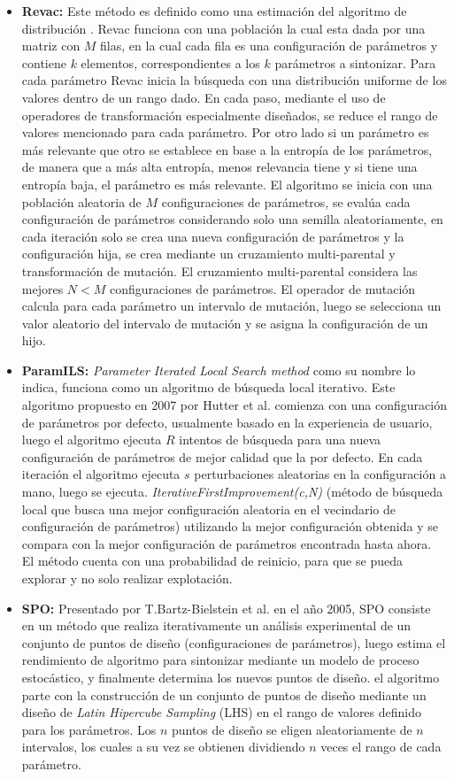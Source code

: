 \documentclass[letter, 10pt]{article}
\begin{document}
\begin{multicols}{2}
\begin{itemize}
    \item \textbf{Revac:} Este método es definido como una estimación del algoritmo de distribución \cite{Pelikan2002ASO}. Revac funciona con una población la cual esta dada por una matriz con $M$ filas, en la cual cada fila es una configuración de parámetros y contiene $k$ elementos, correspondientes a los $k$ parámetros a sintonizar. Para cada parámetro Revac inicia la búsqueda con una distribución uniforme de los valores dentro de un rango dado. En cada paso, mediante el uso de operadores de transformación especialmente diseñados, se reduce el rango de valores mencionado para cada parámetro. Por otro lado si un parámetro es más relevante que otro se establece en base a la entropía de los parámetros, de manera que a más alta entropía, menos relevancia tiene y si tiene una entropía baja, el parámetro es más relevante. El algoritmo se inicia con una población aleatoria de $M$ configuraciones de parámetros, se evalúa cada configuración de parámetros considerando solo una semilla aleatoriamente, en cada iteración solo se crea una nueva configuración de parámetros y la configuración hija, se crea mediante un cruzamiento multi-parental y transformación de mutación. El cruzamiento multi-parental considera las mejores $N<M$ configuraciones de parámetros. El operador de mutación calcula para cada parámetro un intervalo de mutación, luego se selecciona un valor aleatorio del intervalo de mutación y se asigna la configuración de un hijo.
    \item \textbf{ParamILS:}
    \textit{Parameter Iterated Local Search method} como su nombre lo indica, funciona como un algoritmo de búsqueda local iterativo. Este algoritmo propuesto en 2007 por Hutter et al. \cite{Hutter2007AutomaticAC} comienza con una configuración de parámetros por defecto, usualmente basado en la experiencia de usuario, luego el algoritmo ejecuta $R$ intentos de búsqueda para una nueva configuración de parámetros de mejor calidad que la por defecto. En cada iteración el algoritmo ejecuta $s$ perturbaciones aleatorias en la configuración a mano, luego se ejecuta. \textit{IterativeFirstImprovement(c,N)} (método de búsqueda local que busca una mejor configuración aleatoria en el vecindario de configuración de parámetros) utilizando la mejor configuración obtenida y se compara con la mejor configuración de parámetros encontrada hasta ahora. El método cuenta con una probabilidad de reinicio, para que se pueda explorar y no solo realizar explotación.
    \item \textbf{SPO:}
    Presentado por T.Bartz-Bielstein et al. \cite{BartzBeielstein2005SequentialPO} en el año 2005, SPO consiste en un método que realiza iterativamente un análisis experimental de un conjunto de puntos de diseño (configuraciones de parámetros), luego estima el rendimiento de algoritmo para sintonizar mediante un modelo de proceso estocástico, y finalmente determina los nuevos puntos de diseño. el algoritmo parte con la construcción de un conjunto de puntos de diseño mediante un diseño de \textit{Latin Hipercube Sampling} (LHS) en el rango de valores definido para los parámetros. Los $n$ puntos de diseño se eligen aleatoriamente de $n$ intervalos, los cuales a su vez se obtienen dividiendo $n$ veces el rango de cada parámetro. 

\end{itemize}
\end{multicols}
\end{document}
